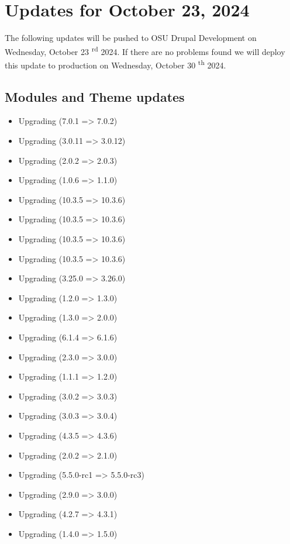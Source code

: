 \section{Updates for October 23, 2024}
The following updates will be pushed to OSU Drupal Development on Wednesday, October 23 \textsuperscript{rd} 2024.
If there are no problems found we will deploy this update to production on Wednesday, October 30 \textsuperscript{th} 2024.
\subsection{Modules and Theme updates}
\begin{itemize}
    \item Upgrading  (7.0.1 => 7.0.2)
    \item Upgrading  (3.0.11 => 3.0.12)
    \item Upgrading  (2.0.2 => 2.0.3)
    \item Upgrading  (1.0.6 => 1.1.0)
    \item Upgrading  (10.3.5 => 10.3.6)
    \item Upgrading  (10.3.5 => 10.3.6)
    \item Upgrading  (10.3.5 => 10.3.6)
    \item Upgrading  (10.3.5 => 10.3.6)
    \item Upgrading  (3.25.0 => 3.26.0)
    \item Upgrading  (1.2.0 => 1.3.0)
    \item Upgrading  (1.3.0 => 2.0.0)
    \item Upgrading  (6.1.4 => 6.1.6)
    \item Upgrading  (2.3.0 => 3.0.0)
    \item Upgrading  (1.1.1 => 1.2.0)
    \item Upgrading  (3.0.2 => 3.0.3)
    \item Upgrading  (3.0.3 => 3.0.4)
    \item Upgrading  (4.3.5 => 4.3.6)
    \item Upgrading  (2.0.2 => 2.1.0)
    \item Upgrading  (5.5.0-rc1 => 5.5.0-rc3)
    \item Upgrading  (2.9.0 => 3.0.0)
    \item Upgrading  (4.2.7 => 4.3.1)
    \item Upgrading  (1.4.0 => 1.5.0)
\end{itemize}
